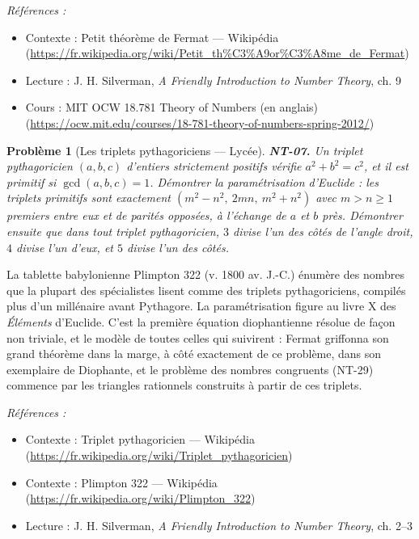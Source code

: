 \documentclass[11pt]{article}
\newtheorem{problem}{Problème}
\newenvironment{refs}{\par\small\noindent\emph{Références :}\begin{itemize}\setlength\itemsep{0pt}}{\end{itemize}\normalsize}
\begin{document}
\begin{refs}
\item Contexte : Petit théorème de Fermat --- Wikipédia (\url{https://fr.wikipedia.org/wiki/Petit_th%C3%A9or%C3%A8me_de_Fermat})
\item Lecture : J. H. Silverman, \textit{A Friendly Introduction to Number Theory}, ch. 9
\item Cours : MIT OCW 18.781 Theory of Numbers (en anglais) (\url{https://ocw.mit.edu/courses/18-781-theory-of-numbers-spring-2012/})
\end{refs}

\bigskip

\begin{problem}[{Les triplets pythagoriciens --- Lycée}]
\textbf{NT-07.} Un triplet pythagoricien $(a, b, c)$ d'entiers strictement
positifs vérifie $a^2 + b^2 = c^2$, et il est primitif si $\gcd(a, b, c) = 1$.
Démontrer la paramétrisation d'Euclide : les triplets primitifs sont exactement
$(m^2 - n^2,\ 2mn,\ m^2 + n^2)$ avec $m > n \ge 1$ premiers entre eux et de parités
opposées, à l'échange de $a$ et $b$ près. Démontrer ensuite que dans tout triplet pythagoricien,
$3$ divise l'un des côtés de l'angle droit, $4$ divise l'un d'eux, et $5$ divise l'un des
côtés.
\end{problem}

\noindent La tablette babylonienne Plimpton 322 (v. 1800 av. J.-C.) énumère des nombres que
la plupart des spécialistes lisent comme des triplets pythagoriciens, compilés plus d'un millénaire
avant Pythagore. La paramétrisation figure au livre X des \textit{Éléments} d'Euclide. C'est la
première équation diophantienne résolue de façon non triviale, et le modèle de toutes celles qui
suivirent : Fermat griffonna son grand théorème dans la marge, à côté exactement de ce problème,
dans son exemplaire de Diophante, et le problème des nombres congruents (NT-29) commence par les
triangles rationnels construits à partir de ces triplets.

\begin{refs}
\item Contexte : Triplet pythagoricien --- Wikipédia (\url{https://fr.wikipedia.org/wiki/Triplet_pythagoricien})
\item Contexte : Plimpton 322 --- Wikipédia (\url{https://fr.wikipedia.org/wiki/Plimpton_322})
\item Lecture : J. H. Silverman, \textit{A Friendly Introduction to Number Theory}, ch. 2--3
\end{refs}
\end{document}
